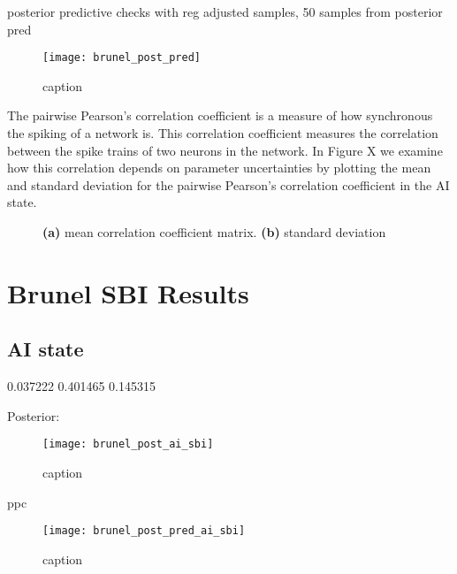 posterior predictive checks with reg adjusted samples, 50 samples from posterior pred

\begin{figure}[H]
    \centering
    \texttt{[image: brunel\_post\_pred]}
    \caption{caption}
    \label{fig:fig1}
\end{figure}

The pairwise Pearson's correlation coefficient is a measure of how synchronous the spiking of a network is. This correlation coefficient measures the correlation between the spike trains of two neurons in the network. In Figure X we examine how this correlation depends on parameter uncertainties by plotting the mean and standard deviation for the pairwise Pearson's correlation coefficient in the AI state.

\begin{figure}[H]
\centering
{}
\qquad
{}
\caption{\textbf{(a)} mean correlation coefficient matrix. \textbf{(b)} standard deviation
}
\label{fig:fig1}
\end{figure}





\section{Brunel SBI Results}

\subsection{AI state} 



0.037222	0.401465	0.145315

Posterior:

\begin{figure}[H]
    \centering
    \texttt{[image: brunel\_post\_ai\_sbi]}
    \caption{caption}
    \label{fig:fig1}
\end{figure}

ppc 

\begin{figure}[H]
    \centering
    \texttt{[image: brunel\_post\_pred\_ai\_sbi]}
    \caption{caption}
    \label{fig:fig1}
\end{figure}

